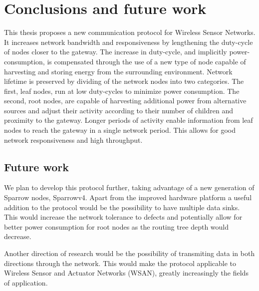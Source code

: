 
\chapter{Conclusions and future work}

This thesis proposes a new communication protocol for Wireless Sensor Networks.
It increases network bandwidth and responsiveness by lengthening the duty-cycle
of nodes closer to the gateway. The increase in duty-cycle, and implicitly
power-consumption, is compensated through the use of a new type of node capable
of harvesting and storing energy from the surrounding environment. Network
lifetime is preserved by dividing of the network nodes into two
categories. The first, leaf nodes, run at low duty-cycles to minimize power
consumption. The second, root nodes, are capable of harvesting additional power
from alternative sources and adjust their activity according to their number of
children and proximity to the gateway.  Longer periods of activity enable
information from leaf nodes to reach the gateway in a single network period.
This allows for good network responsiveness and high throughput.

\section{Future work}

We plan to develop this protocol further, taking advantage of a new generation
of Sparrow nodes, Sparrowv4. Apart from the improved hardware platform a useful
addition to the protocol would be the possibility to have multiple data sinks.
This would increase the network tolerance to defects and potentially allow for
better power consumption for root nodes as the routing tree depth would
decrease. 

Another direction of research would be the possibility of transmiting data in
both directions through the network. This would make the protocol applicable to
Wireless Sensor and Actuator Networks (WSAN), greatly increasingly the fields
of application.

